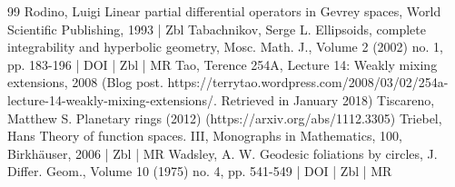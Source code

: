 \begin{thebibliography}{99}
Rodino, Luigi Linear partial differential operators in Gevrey spaces, World Scientific Publishing, 1993 | Zbl
Tabachnikov, Serge L. Ellipsoids, complete integrability and hyperbolic geometry, Mosc. Math. J., Volume 2 (2002) no. 1, pp. 183-196 | DOI | Zbl | MR
Tao, Terence 254A, Lecture 14: Weakly mixing extensions, 2008 (Blog post. https://terrytao.wordpress.com/2008/03/02/254a-lecture-14-weakly-mixing-extensions/. Retrieved in January 2018)
Tiscareno, Matthew S. Planetary rings (2012) (https://arxiv.org/abs/1112.3305)
Triebel, Hans Theory of function spaces. III, Monographs in Mathematics, 100, Birkhäuser, 2006 | Zbl | MR
Wadsley, A. W. Geodesic foliations by circles, J. Differ. Geom., Volume 10 (1975) no. 4, pp. 541-549 | DOI | Zbl | MR
\end{thebibliography}
